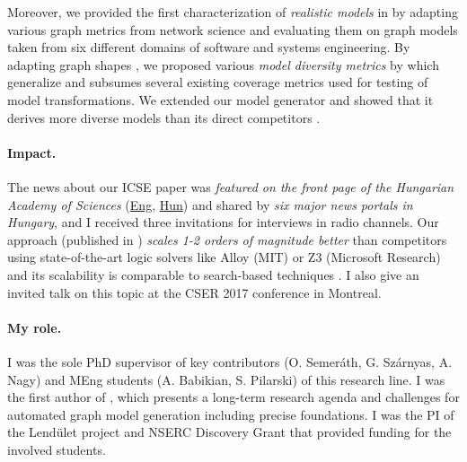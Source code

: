 Moreover, we provided the first characterization of \emph{realistic models} in \cite{MODELS2016-metrics,fmhe2018} by adapting various graph metrics from network science and evaluating them on graph models taken from six different domains of software and systems engineering. By adapting graph shapes \cite{Rensink}, we proposed various \emph{model diversity metrics} \cite{fase2018-diverse,sttt-2019-div} by which generalize and subsumes several existing coverage metrics used for testing of model transformations. We extended our model generator and showed that it derives more diverse models than its direct competitors \cite{fase2018-diverse,fmhe2018,sttt-2019-div}. 


\paragraph{Impact.} 
The news about our ICSE paper \cite{icse2018-solver} was \emph{featured on the front page of the Hungarian Academy of Sciences} (\href{http://mta.hu/english/innovation-of-hungarian-researchers-could-revolutionise-car-industry-design-technology-testing-108434}{Eng}, \href{http://mta.hu/tudomany_hirei/magyar-kutatok-eredmenye-forradalmasithatja-az-autoipari-tervezoeszkozok-teszteleset-108355}{Hun}) and shared by \emph{six major news portals in Hungary}, and I received three invitations for interviews in radio channels. Our approach (published in \cite{sosym2017-dsl,act2017,fmhe2018,fase2018-diverse,icse2018-solver,icse2019-tool}) \emph{scales 1-2 orders of magnitude better} than competitors using state-of-the-art logic solvers like Alloy (MIT) or Z3 (Microsoft Research) and its scalability is comparable to search-based techniques \cite{Soltana2017}. I also give an invited talk on this topic at the CSER 2017 conference in Montreal.


\paragraph{My role.}
I was the sole PhD supervisor of key contributors (O. Semeráth, G. Szárnyas, A. Nagy) and MEng students (A. Babikian, S. Pilarski) of this research line. I was the first author of \cite{fmhe2018}, which presents a long-term research agenda and challenges for automated graph model generation including precise foundations. I was the PI of the Lendület project and NSERC Discovery Grant that provided funding for the involved students.


